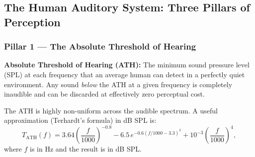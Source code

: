 \begin{center}
\end{center}

\subsection{The Human Auditory System: Three Pillars of Perception}

\subsubsection{Pillar 1 --- The Absolute Threshold of Hearing}

\begin{definitionbox}
\textbf{Absolute Threshold of Hearing (ATH):} The minimum sound pressure level (SPL) at each frequency that an average human can detect in a perfectly quiet environment. Any sound \emph{below} the ATH at a given frequency is completely inaudible and can be discarded at effectively zero perceptual cost.
\end{definitionbox}

The ATH is highly non-uniform across the audible spectrum. A useful approximation (Terhardt's formula) in dB SPL is:
\begin{equation}
T_{\text{ATH}}(f) = 3.64\left(\frac{f}{1000}\right)^{-0.8} - 6.5\,e^{-0.6(f/1000 - 3.3)^2} + 10^{-3}\!\left(\frac{f}{1000}\right)^4,
\label{eq:ath}
\end{equation}
where $f$ is in Hz and the result is in dB SPL.

